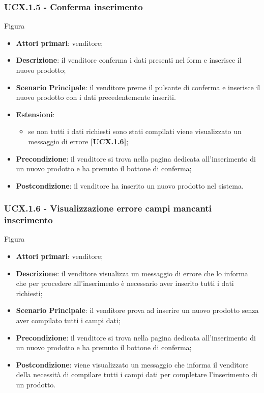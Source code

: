 \subsubsection{UCX.1.5 - Conferma inserimento}
Figura \\
\begin{itemize}
\item \textbf{Attori primari}: venditore;
\item \textbf{Descrizione}: il venditore conferma i dati presenti nel form e inserisce il nuovo prodotto;
\item \textbf{Scenario Principale}: il venditore preme il pulsante di conferma e inserisce il nuovo prodotto con i dati precedentemente inseriti.
\item \textbf{Estensioni}: 
\begin{itemize}
	\item se non tutti i dati richiesti sono stati compilati viene visualizzato un messaggio di errore \textbf{[UCX.1.6]};
\end{itemize} 
\item \textbf{Precondizione}: il venditore si trova nella pagina dedicata all'inserimento di un nuovo prodotto e ha premuto il bottone di conferma;
\item \textbf{Postcondizione}: il venditore ha inserito un nuovo prodotto nel sistema.
\end{itemize}

\subsubsection{UCX.1.6 - Visualizzazione errore campi mancanti inserimento}
Figura \\
\begin{itemize}
\item \textbf{Attori primari}: venditore;
\item \textbf{Descrizione}: il venditore visualizza un messaggio di errore che lo informa che per procedere all'inserimento è necessario aver inserito tutti i dati richiesti;
\item \textbf{Scenario Principale}: il venditore prova ad inserire un nuovo prodotto senza aver compilato tutti i campi dati;
\item \textbf{Precondizione}: il venditore si trova nella pagina dedicata all'inserimento di un nuovo prodotto e ha premuto il bottone di conferma;
\item \textbf{Postcondizione}: viene visualizzato un messaggio che informa il venditore della necessità di compilare tutti i campi dati per completare l'inserimento di un prodotto.
\end{itemize}

